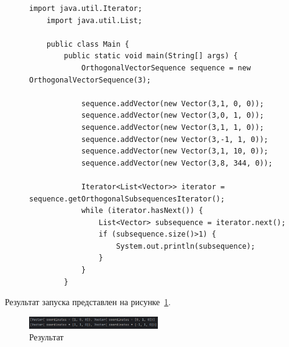 \documentclass[a4paper, 14pt]{extarticle}
\begin{document}
	\begin{figure}[!htb]
		\begin{lstlisting}[language={},caption={Класс Main, в котором реализована проверка работы класса OrthogonalVectorSequence},label={lst:code2}]
	import java.util.Iterator;
	import java.util.List;
		
	public class Main {
		public static void main(String[] args) {
			OrthogonalVectorSequence sequence = new OrthogonalVectorSequence(3);
				
			sequence.addVector(new Vector(3,1, 0, 0));
			sequence.addVector(new Vector(3,0, 1, 0));
			sequence.addVector(new Vector(3,1, 1, 0));
			sequence.addVector(new Vector(3,-1, 1, 0));
			sequence.addVector(new Vector(3,1, 10, 0));
			sequence.addVector(new Vector(3,8, 344, 0));
				
			Iterator<List<Vector>> iterator = sequence.getOrthogonalSubsequencesIterator();
			while (iterator.hasNext()) {
				List<Vector> subsequence = iterator.next();
				if (subsequence.size()>1) {
					System.out.println(subsequence);
				}
			}
		}
		\end{lstlisting}
	\end{figure}
	
	Результат запуска представлен на рисунке~\ref{fig:img1}.
	
	\begin{figure}[!htb]
		\centering
		\includegraphics[width=0.5\textwidth]{img1}
		\caption{Результат}
		\label{fig:img1}
	\end{figure}
	
\end{document}
